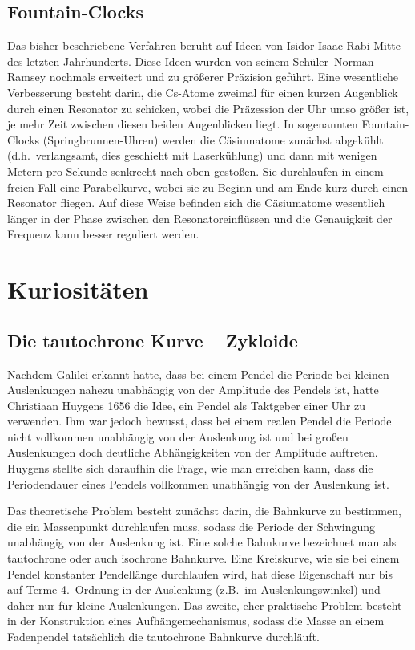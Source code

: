 \subsection{Fountain-Clocks}

Das bisher beschriebene Verfahren beruht auf Ideen von 
Isidor Isaac Rabi 
Mitte des letzten Jahrhunderts.
Diese Ideen wurden von seinem \glqq Sch\"uler\grqq\ Norman Ramsey nochmals erweitert und zu gr\"o\ss erer
Pr\"azision gef\"uhrt. Eine wesentliche Verbesserung besteht darin, die Cs-Atome zweimal f\"ur einen
kurzen Augenblick durch einen Resonator zu schicken, wobei die Pr\"azession der Uhr umso gr\"o\ss er ist, je
mehr Zeit zwischen diesen beiden Augenblicken liegt. 
In sogenannten Fountain-Clocks (\glqq Springbrunnen-Uhren\grqq)
werden die C\"asiumatome zun\"achst abgek\"uhlt (d.h.\ verlangsamt, dies geschieht mit Laserk\"uhlung) 
und dann mit wenigen Metern pro
Sekunde senkrecht nach oben gesto\ss en. Sie durchlaufen in einem freien Fall eine Parabelkurve, wobei
sie zu Beginn und am Ende kurz durch einen Resonator fliegen. Auf diese Weise befinden sich die C\"asiumatome 
wesentlich l\"anger in der Phase zwischen den Resonatoreinfl\"ussen und die Genauigkeit der Frequenz 
kann besser reguliert werden. 

\section{Kuriosit\"aten}

\subsection{Die tautochrone Kurve -- Zykloide}

Nachdem Galilei erkannt hatte, dass bei einem Pendel die Periode bei kleinen Auslenkungen
nahezu unabh\"angig von der Amplitude des Pendels ist, hatte 
Christiaan Huygens 
1656 die Idee, ein Pendel als Taktgeber einer Uhr zu verwenden. Ihm war jedoch
bewusst, dass bei einem realen Pendel die Periode nicht vollkommen unabh\"angig von der Auslenkung
ist und bei gro\ss en Auslenkungen doch deutliche Abh\"angigkeiten von der Amplitude auftreten.
Huygens stellte sich daraufhin die Frage, wie man erreichen kann, dass die Periodendauer eines
Pendels vollkommen unabh\"angig von der Auslenkung ist. 

Das theoretische Problem besteht zun\"achst darin, die Bahnkurve zu bestimmen, die ein
Massenpunkt durchlaufen muss, sodass die Periode der Schwingung unabh\"angig von der Auslenkung ist.
Eine solche Bahnkurve bezeichnet man als 
tautochrone oder auch isochrone Bahnkurve.
Eine Kreiskurve, wie sie bei einem Pendel konstanter Pendell\"ange durchlaufen wird, hat diese 
Eigenschaft nur bis auf Terme 4.\ Ordnung in der Auslenkung (z.B.\ im Auslenkungswinkel) und daher
nur f\"ur kleine Auslenkungen. Das
zweite, eher praktische Problem besteht in der Konstruktion eines Aufh\"angemechanismus,
sodass die Masse an einem Fadenpendel tats\"achlich die tautochrone Bahnkurve durchl\"auft.

